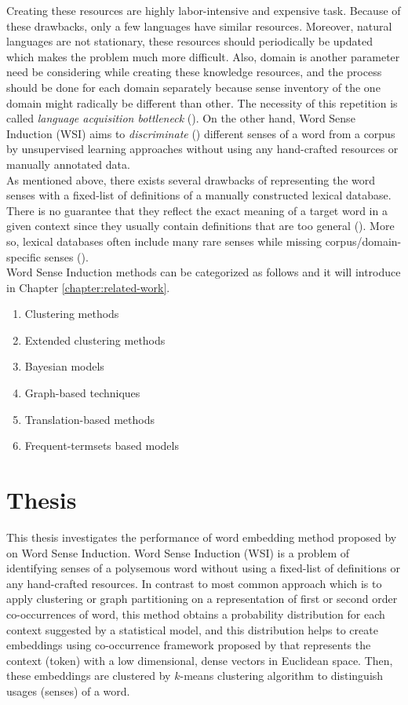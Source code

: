 Creating these resources are highly labor-intensive and expensive task. Because of these drawbacks, only a few languages have similar resources. Moreover, natural languages are not stationary, these resources should periodically be updated which makes the problem much more difficult. Also, domain is another parameter need be considering while creating these knowledge resources, and the process should be done for each domain separately because sense inventory of the one domain might radically be different than other. The necessity of this repetition is called \emph{language acquisition bottleneck} (\cite{gale92work}). On the other hand, Word Sense Induction (WSI) aims to \emph{discriminate} (\cite{schutze98automatic}) different senses of a word from a corpus by unsupervised learning approaches without using any hand-crafted resources or manually annotated data.  \\

As mentioned above, there exists several drawbacks of representing the word senses with a fixed-list of definitions of a manually constructed lexical database. There is no guarantee that they reflect the exact meaning of a target
word in a given context since they usually contain definitions that are too general (\cite{veronis04hyperlex}).
More so, lexical databases often include many rare senses while missing corpus/domain-specific senses (\cite{pantel02discovering}). \\

Word Sense Induction methods can be categorized as follows and it will introduce in Chapter \ref{chapter:related-work}.

\begin{enumerate}
\item Clustering methods
\item Extended clustering methods
\item Bayesian models
\item Graph-based techniques
\item Translation-based methods
\item Frequent-termsets based models 
\end{enumerate}


\section{Thesis}

This thesis investigates the performance of word embedding method proposed by \cite{yatbaz2012learning} on Word Sense Induction. Word Sense Induction (WSI) is  a problem of identifying senses of a polysemous word without using a fixed-list of definitions or any hand-crafted resources. In contrast to most common approach which is to apply clustering or graph partitioning on a representation of first or second order co-occurrences of word, this method obtains a probability distribution for each context suggested by a statistical model, and this distribution helps to create embeddings using co-occurrence framework proposed by \cite{globerson2004euclidean} that represents the context (token) with a low dimensional, dense vectors in Euclidean space. Then, these embeddings are clustered by $k$-means clustering algorithm to distinguish usages (senses) of a word.



